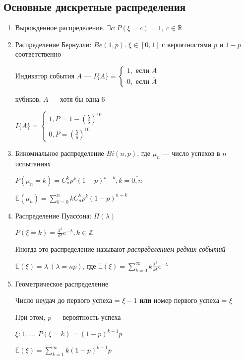 \documentclass[a4paper, 10pt]{article}
\begin{document}
\subsection{Основные дискретные распределения}
\begin{enumerate}
    \item Вырожденное распределение. $\exists c:P(\xi=c)=1,\ c\in\mathbb{R}$
    \item Распределение Бернулли: $Be(1,p)$. $\xi\in[0,1]$ с вероятностями $p$ и $1-p$ соответственно

    Индикатор события $A$ — $I\{A\}=\begin{cases}
        1,\text{ если }A\\
        0,\text{ если }\overline{A}
    \end{cases}$

     кубиков, $A$ — хотя бы одна 6

    $I\{A\}=\begin{cases}
        1, P=1-\left(\frac{5}{6}\right)^{10}\\
        0, P=\left(\frac{5}{6}\right)^{10}
    \end{cases}$
    \item Биномиальное распределение $Bi(n,p)$, где $\mu_n$ — число успехов в $n$ испытаниях

    $P(\mu_n=k)=C_n^kp^{k}(1-p)^{n-k},k=\overline{0,n}$

    $\mathbb{E}(\mu_n)=\sum_{k=0}^{n}kC_n^kp^k(1-p)^{n-k}$

    \item Распределение Пуассона: $\Pi(\lambda)$

    $P(\xi=k)=\displaystyle\frac{\lambda^k}{k!}e^{-\lambda},k\in\mathbb{Z}$

    Иногда это распределение называют \textit{распределением редких событий}

    $\mathbb{E}(\xi)=\lambda\ (\lambda=np)$, где $\mathbb{E}(\xi)=\sum_{k=0}^{\infty} k\displaystyle\frac{\lambda^k}{k!}e^{-\lambda}$

    \item Геометрическое распределение
    
    \ex Число неудач до первого успеха = $\xi-1$ \textbf{или} номер первого успеха = $\xi$
    
    При этом, $p$ — вероятность успеха

    $\xi:1,\ldots$. $P(\xi=k)=(1-p)^{k-1}p$

     $\mathbb{E}(\xi)=\sum_{k=1}^{\infty} k(1-p)^{k-1}p$


\end{enumerate}
\end{document}

